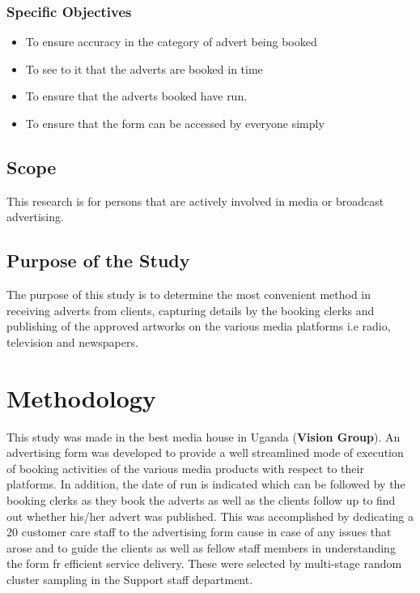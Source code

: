 \documentclass[11pt,A4paper]{article}
\begin{document}
\subsubsection{\textbf{Specific Objectives}}

\begin{itemize}
\item To ensure accuracy in the category of advert being booked
\item To see to it that the adverts are booked in time
  \item To ensure that the adverts booked have run.
  \item To ensure that the form can be accessed by everyone simply
\end{itemize}


\subsection{\textbf{Scope}}
This research is for persons that are actively involved in media or broadcast advertising.

\subsection{\textbf{Purpose of the Study}}
The purpose of this study is to determine the most convenient method in receiving adverts from clients, capturing details by the booking clerks and publishing of the approved artworks on the various media platforms i.e radio, television and newspapers.


\section{\textbf{Methodology}}
This study was made in the best media house in Uganda (\textbf{Vision Group}). An advertising form was developed to provide a well streamlined mode of execution of booking activities of the various media products with respect to their platforms. In addition, the date of run is indicated which can be followed by the booking clerks as they book the adverts as well as the clients follow up to find out whether his/her advert was published. This was accomplished by dedicating a 20 customer care staff to the advertising form cause in case of any issues that arose and to guide the clients as well as fellow staff members  in understanding the form fr efficient service delivery. These were selected by multi-stage random cluster sampling in the Support staff department.
\end{document}
